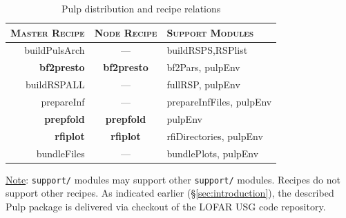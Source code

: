 \documentclass[a4paper,10pt,bibtotoc]{scrartcl}
\begin{document}
\begin{table}[ht]
\centering
\begin{tabular}{|r|c|l|}
\hline
\textsc{Master Recipe} &\textsc{Node Recipe}&\textsc{Support Modules}\\
\hline \hline
buildPulsArch & --- & buildRSPS,RSPlist\\
\hline
    \textbf{bf2presto} & \textbf{bf2presto} & bf2Pars, pulpEnv\\
\hline
  buildRSPALL &    ---    & fullRSP, pulpEnv\\
\cline{1-2}
   prepareInf &    ---    & prepareInfFiles, pulpEnv\\
\hline
    \textbf{prepfold} & \textbf{prepfold}  & pulpEnv\\
\hline
      \textbf{rfiplot} &\textbf{rfiplot}   & rfiDirectories, pulpEnv\\
\hline
bundleFiles &    ---    & bundlePlots, pulpEnv\\
\hline
\end{tabular}
  \caption{Pulp distribution and recipe relations}
  \label{tab:recipeTable}
\end{table}

\underline{Note}: \verb|support/| modules may support other \verb|support/| modules. Recipes do not support other recipes.
\newline
As indicated earlier (\S \ref{sec:introduction}), the described Pulp package is delivered 
via checkout of the LOFAR USG code repository.
\end{document}
